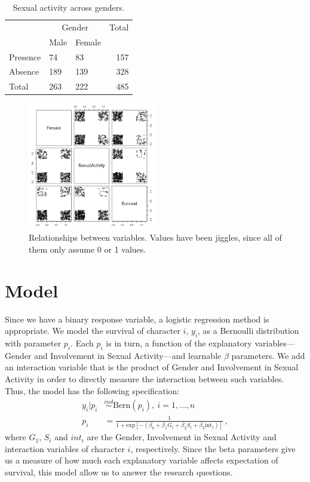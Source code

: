 \documentclass[12pt]{article}
\begin{document}
\begin{table}[hbtp]
    \centering
    \footnotesize
    \caption{Sexual activity across genders.}
    \label{tab:sexXgender}
    \begin{tabularx}{\textwidth}{X X X r}
        \toprule
        & \multicolumn{2}{c}{Gender} & Total \\
        \cmidrule{2-3}
        & Male & Female & \\
        \midrule 
        Presence & 74 & 83 & 157 \\
        Absence & 189 & 139 & 328\\  
        Total & 263 & 222& 485\\  
        \bottomrule
       \end{tabularx}
\end{table}



\begin{figure}[hbtp]  
    \centering
    \includegraphics[width=0.5\textwidth]{media/pairs.png}
    \caption{Relationships between variables. Values have been jiggles, since all of them only assume 0 or 1 values.}
    \label{fig:pairs}
    \end{figure}

\section{Model}
Since we have a binary response variable, a logistic regression method is appropriate. We model the survival of character $i$, $y_i$, as a Bernoulli distribution with parameter $p_i$. Each $p_i$ is in turn, a function of the explanatory variables---Gender and Involvement in Sexual Activity---and learnable $\beta$ parameters. We add an interaction variable that is the product of Gender and Involvement in Sexual Activity in order to directly measure the interaction between such variables. Thus, the model has the following specification:
\begin{align}
    y_i | p_i &\stackrel{ind}{\sim} \text{Bern}(p_i),~i=1,\dots,n\\
    p_i &= \frac{1}{1+\text{exp}\left[-\left(\beta_0 + \beta_1G_i + \beta_2S_i + \beta_3\text{int}_i\right)\right]}\,,
\end{align}
where $G_1$, $S_i$ and $int_i$ are the Gender, Involvement in Sexual Activity and interaction variables of character $i$, respectively. Since the beta parameters give us a measure of how much each explanatory variable affects expectation of survival, this model allow us to answer the research questions.
\end{document}
